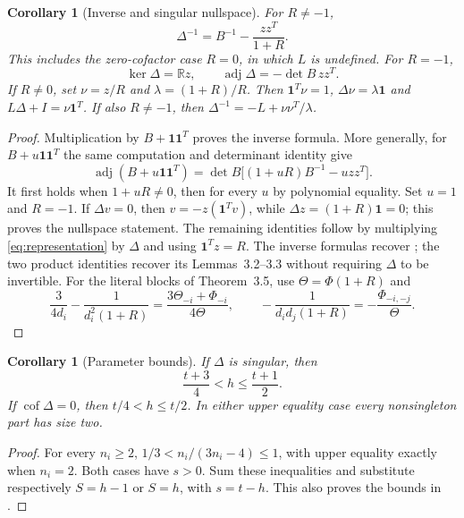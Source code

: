 \documentclass[11pt]{article}
\newtheorem{corollary}[theorem]{Corollary}
\newcommand{\cof}{\operatorname{cof}}
\newcommand{\one}{\mathbf{1}}
\newcommand{\R}{\mathbb{R}}
\begin{document}
\begin{corollary}[Inverse and singular nullspace]\label{cor:inverse}
For $R\ne-1$,
\[
 \Delta^{-1}=B^{-1}-\frac{zz^T}{1+R}.
\]
This includes the zero-cofactor case $R=0$, in which $L$ is undefined.
For $R=-1$,
\[
 \ker\Delta=\R z,\qquad
 \operatorname{adj}\Delta=-\det B\,zz^T.
\]
If $R\ne0$, set $\nu=z/R$ and $\lambda=(1+R)/R$. Then
$\one^T\nu=1$, $\Delta\nu=\lambda\one$ and
$L\Delta+I=\nu\one^T$. If also $R\ne-1$, then
$\Delta^{-1}=-L+\nu\nu^T/\lambda$.
\end{corollary}
\begin{proof}
Multiplication by $B+\one\one^T$ proves the inverse formula.
More generally, for $B+u\one\one^T$ the same computation and determinant
identity give
\[
 \operatorname{adj}(B+u\one\one^T)
 =\det B\bigl[(1+uR)B^{-1}-u zz^T\bigr].
\]
It first holds when $1+uR\ne0$, then for every $u$ by polynomial equality.
Set $u=1$ and $R=-1$. If $\Delta v=0$, then
$v=-z(\one^Tv)$, while $\Delta z=(1+R)\one=0$;
this proves the nullspace statement. The remaining identities follow by
multiplying \eqref{eq:representation} by $\Delta$ and using
$\one^Tz=R$.
The inverse formulas recover \cite[Theorems~3.4--3.5]{DM24}; the two
product identities recover its Lemmas~3.2--3.3 without requiring
$\Delta$ to be invertible.
For the literal blocks of Theorem~3.5, use $\Theta=\Phi(1+R)$ and
\[
 \frac3{4d_i}-\frac1{d_i^2(1+R)}
 =\frac{3\Theta_{-i}+\Phi_{-i}}{4\Theta},\qquad
 -\frac1{d_id_j(1+R)}=-\frac{\Phi_{-i,-j}}{\Theta}.
\]
\end{proof}

\begin{corollary}[Parameter bounds]\label{cor:bounds}
If $\Delta$ is singular, then
\[
 \frac{t+3}{4}<h\le\frac{t+1}{2}.
\]
If $\cof\Delta=0$, then $t/4<h\le t/2$.
In either upper equality case every nonsingleton part has size two.
\end{corollary}
\begin{proof}
For every $n_i\ge2$,
$1/3<n_i/(3n_i-4)\le1$, with upper equality exactly when $n_i=2$.
Both cases have $s>0$. Sum these inequalities and substitute respectively
$S=h-1$ or $S=h$, with $s=t-h$.
This also proves the bounds in \cite[Theorem~2.6]{DM24}.
\end{proof}
\end{document}
